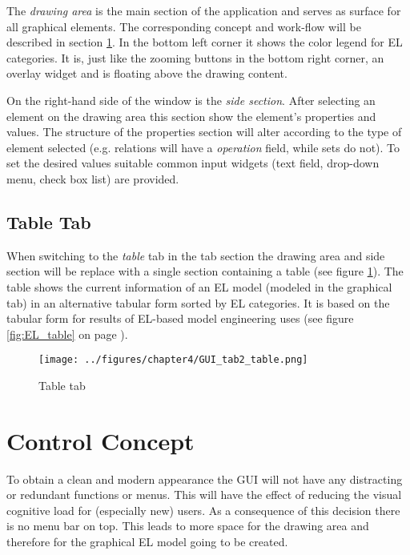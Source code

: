 \documentclass[twoside, openright, 12pt]{book}
\begin{document}
\noindent
The \textit{drawing area} is the main section of the application and serves as surface for all graphical elements.
The corresponding concept and work-flow will be described in section \ref{GUI_concept}.
In the bottom left corner it shows the color legend for EL categories.
It is, just like the zooming buttons in the bottom right corner, an overlay widget and is floating above the drawing content.

On the right-hand side of the window is the \textit{side section}.
After selecting an element on the drawing area this section show the element's properties and values.
The structure of the properties section will alter according to the type of element selected (e.g. relations will have a \textit{operation} field, while sets do not).
To set the desired values suitable common input widgets (text field, drop-down menu, check box list) are provided.



\subsection{Table Tab}
\label{editor_table}
When switching to the \textit{table} tab in the tab section the drawing area and side section will be replace with a single section containing a table (see figure \ref{fig:GUI_tab2_table}).
The table shows the current information of an EL model (modeled in the graphical tab) in an alternative tabular form sorted by EL categories.
It is based on the tabular form for results of EL-based model engineering \cite{Amthor18} uses (see figure \ref{fig:EL_table} on page \pageref{fig:EL_table}).

\begin{figure}[htb]
	\centering
	\texttt{[image: ../figures/chapter4/GUI\_tab2\_table.png]}
	\caption{Table tab}
	\label{fig:GUI_tab2_table}
\end{figure}



\section{Control Concept}
\label{GUI_concept}
To obtain a clean and modern appearance the GUI will not have any distracting or redundant functions or menus.
This will have the effect of reducing the visual cognitive load for (especially new) users.
As a consequence of this decision there is no menu bar on top.
This leads to more space for the drawing area and therefore for the graphical EL model going to be created.
\end{document}
